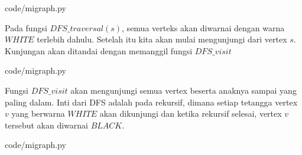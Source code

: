
                {code/migraph.py}

Pada fungsi $DFS\_traversal(s)$, semua verteks akan diwarnai dengan warna $WHITE$ terlebih dahulu. Setelah itu kita akan mulai mengunjungi dari vertex $s$. Kunjungan akan ditandai dengan memanggil fungsi $DFS\_visit$


                {code/migraph.py}

Fungsi $DFS\_visit$ akan mengunjungi semua vertex beserta anaknya sampai yang paling dalam. Inti dari DFS adalah pada rekursif, dimana setiap tetangga vertex $v$ yang berwarna $WHITE$ akan dikunjungi dan ketika rekursif selesai, vertex $v$ tersebut akan diwarnai $BLACK$.


                {code/migraph.py}

